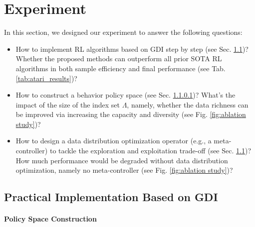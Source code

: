 \section{Experiment}
\label{sec: experiment}
In this section, we designed our experiment to answer the following questions:
\begin{itemize}
    \item How to implement RL algorithms based on GDI step by step (see Sec. \ref{sec: Practical Implement Based on GDI})?  Whether the proposed methods can outperform all prior SOTA RL algorithms in both sample efficiency and final performance  (see Tab. \ref{tab:atari_results})?
    \item How to construct a behavior policy space (see Sec. \ref{sec: Policy Space Construction})? What's the impact of the size of the index set $\Lambda$, namely, whether the data richness can be improved via increasing the capacity and diversity (see Fig. \ref{fig:ablation study})?
    \item How to design a data distribution optimization operator (e.g., a meta-controller) to tackle the exploration and exploitation trade-off (see Sec. \ref{sec: Practical Implement Based on GDI})? How much performance would be degraded without data distribution optimization, namely no meta-controller (see Fig. \ref{fig:ablation study})?
\end{itemize}

\subsection{Practical Implementation Based on GDI}
\label{sec: Practical Implement Based on GDI}


\paragraph{Policy Space Construction}
\label{sec: Policy Space Construction}


